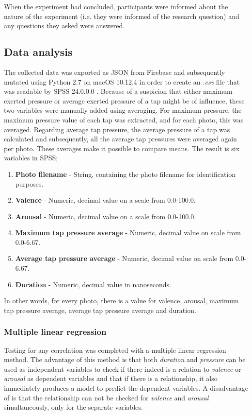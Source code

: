 \documentclass{sigchi}
\begin{document}
When the experiment had concluded, participants were informed about the nature of the experiment (i.e. they were informed of the research question) and any questions they asked were answered.

\subsection{Data analysis}
\label{sub:data_analysis}
The collected data was exported as JSON from Firebase and subsequently mutated using Python 2.7 \cite{python} on macOS 10.12.4 \cite{macOSSierra} in order to create an \textit{.csv} file that was readable by SPSS 24.0.0.0 \cite{SPSS}. Because of a suspicion that either maximum exerted pressure or average exerted pressure of a tap might be of influence, these two variables were manually added using averaging. For maximum pressure, the maximum pressure value of each tap was extracted, and for each photo, this was averaged. Regarding average tap pressure, the average pressure of a tap was calculated and subsequently, all the average tap pressures were averaged again per photo. These averages make it possible to compare means. The result is six variables in SPSS; 
\begin{enumerate}
  \item \textbf{Photo filename} - String, containing the photo filename for identification purposes.
  \item \textbf{Valence} - Numeric, decimal value on a scale from 0.0-100.0.
  \item \textbf{Arousal} - Numeric, decimal value on a scale from 0.0-100.0.
  \item \textbf{Maximum tap pressure average} - Numeric, decimal value on scale from 0.0-6.67.
  \item \textbf{Average tap pressure average} - Numeric, decimal value on scale from 0.0-6.67.
  \item \textbf{Duration} - Numeric, decimal value in nanoseconds.
\end{enumerate}

In other words, for every photo, there is a value for valence, arousal, maximum tap pressure average, average tap pressure average and duration.

\subsubsection{Multiple linear regression}
\label{subsub:multiple_linear_regression}
Testing for any correlation was completed with a multiple linear regression method. The advantage of this method is that both \textit{duration} and \textit{pressure} can be used as independent variables to check if there indeed is a relation to \textit{valence} or \textit{arousal} as dependent variables and that if there is a relationship, it also immediately produces a model to predict the dependent variables. A disadvantage of is that the relationship can not be checked for \textit{valence} and \textit{arousal} simultaneously, only for the separate variables.
\end{document}
